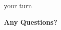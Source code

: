\documentclass[11pt,compress,t,notes=noshow, xcolor=table]{beamer}
\begin{document}

\begin{frame}{your turn}

\vfill

\centering \Huge{\bf Any Questions?}

\vfill

\end{frame}


\endlecture
\end{document}
